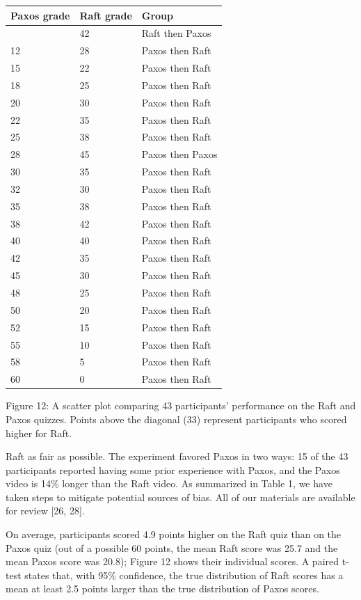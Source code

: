 \documentclass[
]{article}
\newcounter{none} %
\begin{document}
{\def\LTcaptype{none} %
\begin{longtable}[]{@{}lll@{}}
\toprule\noalign{}
Paxos grade & Raft grade & Group \\
\midrule\noalign{}
\endhead
\bottomrule\noalign{}
\endlastfoot
10 & 42 & Raft then Paxos \\
12 & 28 & Paxos then Raft \\
15 & 22 & Paxos then Raft \\
18 & 25 & Paxos then Raft \\
20 & 30 & Paxos then Raft \\
22 & 35 & Paxos then Raft \\
25 & 38 & Paxos then Raft \\
28 & 45 & Paxos then Paxos \\
30 & 35 & Paxos then Raft \\
32 & 30 & Paxos then Raft \\
35 & 38 & Paxos then Raft \\
38 & 42 & Paxos then Raft \\
40 & 40 & Paxos then Raft \\
42 & 35 & Paxos then Raft \\
45 & 30 & Paxos then Raft \\
48 & 25 & Paxos then Raft \\
50 & 20 & Paxos then Raft \\
52 & 15 & Paxos then Raft \\
55 & 10 & Paxos then Raft \\
58 & 5 & Paxos then Raft \\
60 & 0 & Paxos then Raft \\
\end{longtable}
}

Figure 12: A scatter plot comparing 43 participants' performance on the
Raft and Paxos quizzes. Points above the diagonal (33) represent
participants who scored higher for Raft.

Raft as fair as possible. The experiment favored Paxos in two ways: 15
of the 43 participants reported having some prior experience with Paxos,
and the Paxos video is 14\% longer than the Raft video. As summarized in
Table 1, we have taken steps to mitigate potential sources of bias. All
of our materials are available for review {[}26, 28{]}.

On average, participants scored 4.9 points higher on the Raft quiz than
on the Paxos quiz (out of a possible 60 points, the mean Raft score was
25.7 and the mean Paxos score was 20.8); Figure 12 shows their
individual scores. A paired t-test states that, with 95\% confidence,
the true distribution of Raft scores has a mean at least 2.5 points
larger than the true distribution of Paxos scores.
\end{document}
